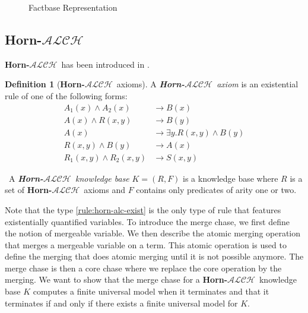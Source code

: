 \documentclass{article}
\theoremstyle{definition}
\newtheorem{definition}{Definition}[section]
\theoremstyle{remark}
\newcommand{\ALCH}{\textbf{Horn-$\mathcal{ALCH}$}}
\begin{document}
\begin{figure}
\label{figure:graph}
\caption{Factbase Representation}
\end{figure}

\subsection{\ALCH }

\ALCH\ has been introduced in \cite{Horn-ALC}.

\begin{definition}[\ALCH\ axioms]
A \emph{\ALCH\ axiom} is an existential rule of one of the following forms:
\begin{align}
A_1(x) \wedge A_2(x) &\rightarrow B(x) \\
A(x) \wedge R(x,y) &\rightarrow B(y) \\
A(x) &\rightarrow \exists y.R(x,y) \wedge B(y) \label{rule:horn-alc-exist} \\
R(x,y) \wedge B(y) &\rightarrow A(x) \\
R_1(x,y) \wedge R_2(x,y) &\rightarrow S(x,y)
\end{align}


\
A \emph{\ALCH\ knowledge base} $K = (R,F)$ is a knowledge base where $R$ is a set of \ALCH\ axioms and $F$ contains only predicates of arity one or two. 

\end{definition}

Note that the type \ref{rule:horn-alc-exist} is the only type of rule that features existentially quantified variables. To introduce the merge chase, we first define the notion of mergeable variable. We then describe the atomic merging operation that merges a mergeable variable on a term. This atomic operation is used to define the merging that does atomic merging until it is not possible anymore. The merge chase is then a core chase where we replace the core operation by the merging. We want to show that the merge chase for a \ALCH\ knowledge base $K$ computes a finite universal model when it terminates and that it terminates if and only if there exists a finite universal model for $K$. 
\end{document}
